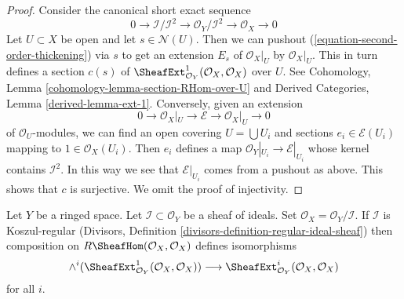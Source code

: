 \begin{proof}
Consider the canonical short exact sequence
\begin{equation}
\label{equation-second-order-thickening}
0 \to \mathcal{I}/\mathcal{I}^2 \to \mathcal{O}_Y/\mathcal{I}^2 \to
\mathcal{O}_X \to 0
\end{equation}
Let $U \subset X$ be open and let $s \in \mathcal{N}(U)$. Then we can
pushout (\ref{equation-second-order-thickening}) via $s$ to
get an extension $E_s$ of $\mathcal{O}_X|_U$ by $\mathcal{O}_X|_U$.
This in turn defines a section $c(s)$ of
$\SheafExt^1_{\mathcal{O}_Y}(\mathcal{O}_X, \mathcal{O}_X)$
over $U$.
See Cohomology, Lemma \ref{cohomology-lemma-section-RHom-over-U}
and Derived Categories, Lemma \ref{derived-lemma-ext-1}.
Conversely, given an extension
$$
0 \to \mathcal{O}_X|_U \to \mathcal{E} \to \mathcal{O}_X|_U \to 0
$$
of $\mathcal{O}_U$-modules, we can find an open covering
$U = \bigcup U_i$ and sections $e_i \in \mathcal{E}(U_i)$
mapping to $1 \in \mathcal{O}_X(U_i)$. Then $e_i$ defines a map
$\mathcal{O}_Y|_{U_i} \to \mathcal{E}|_{U_i}$ whose kernel
contains $\mathcal{I}^2$. In this way we see that
$\mathcal{E}|_{U_i}$ comes from a pushout as above.
This shows that $c$ is surjective. We omit the proof
of injectivity.
\end{proof}

\begin{lemma}
\label{lemma-regular-ideal-ext}
Let $Y$ be a ringed space. Let $\mathcal{I} \subset \mathcal{O}_Y$
be a sheaf of ideals. Set $\mathcal{O}_X = \mathcal{O}_Y/\mathcal{I}$.
If $\mathcal{I}$ is Koszul-regular
(Divisors, Definition \ref{divisors-definition-regular-ideal-sheaf})
then composition on $R\SheafHom(\mathcal{O}_X, \mathcal{O}_X)$
defines isomorphisms
$$
\wedge^i(\SheafExt^1_{\mathcal{O}_Y}(\mathcal{O}_X, \mathcal{O}_X))
\longrightarrow
\SheafExt^i_{\mathcal{O}_Y}(\mathcal{O}_X, \mathcal{O}_X)
$$
for all $i$.
\end{lemma}

